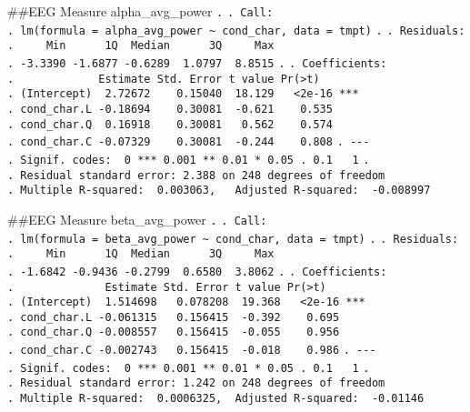 \documentclass[
]{article}
\begin{document}
\#\#EEG Measure alpha\_avg\_power \texttt{.} \texttt{.\ Call:}
\texttt{.\ lm(formula\ =\ alpha\_avg\_power\ \textasciitilde{}\ cond\_char,\ data\ =\ tmpt)}
\texttt{.} \texttt{.\ Residuals:}
\texttt{.\ \ \ \ \ Min\ \ \ \ \ \ 1Q\ \ Median\ \ \ \ \ \ 3Q\ \ \ \ \ Max}
\texttt{.\ -3.3390\ -1.6877\ -0.6289\ \ 1.0797\ \ 8.8515} \texttt{.}
\texttt{.\ Coefficients:}
\texttt{.\ \ \ \ \ \ \ \ \ \ \ \ \ Estimate\ Std.\ Error\ t\ value\ Pr(\textgreater{}\textbar{}t\textbar{})}
\texttt{.\ (Intercept)\ \ 2.72672\ \ \ \ 0.15040\ \ 18.129\ \ \ \textless{}2e-16\ ***}
\texttt{.\ cond\_char.L\ -0.18694\ \ \ \ 0.30081\ \ -0.621\ \ \ \ 0.535}
\texttt{.\ cond\_char.Q\ \ 0.16918\ \ \ \ 0.30081\ \ \ 0.562\ \ \ \ 0.574}
\texttt{.\ cond\_char.C\ -0.07329\ \ \ \ 0.30081\ \ -0.244\ \ \ \ 0.808}
\texttt{.\ -\/-\/-}
\texttt{.\ Signif.\ codes:\ \ 0\ \textquotesingle{}***\textquotesingle{}\ 0.001\ \textquotesingle{}**\textquotesingle{}\ 0.01\ \textquotesingle{}*\textquotesingle{}\ 0.05\ \textquotesingle{}.\textquotesingle{}\ 0.1\ \textquotesingle{}\ \textquotesingle{}\ 1}
\texttt{.}
\texttt{.\ Residual\ standard\ error:\ 2.388\ on\ 248\ degrees\ of\ freedom}
\texttt{.\ Multiple\ R-squared:\ \ 0.003063,\ \ \ Adjusted\ R-squared:\ \ -0.008997}

\#\#EEG Measure beta\_avg\_power \texttt{.} \texttt{.\ Call:}
\texttt{.\ lm(formula\ =\ beta\_avg\_power\ \textasciitilde{}\ cond\_char,\ data\ =\ tmpt)}
\texttt{.} \texttt{.\ Residuals:}
\texttt{.\ \ \ \ \ Min\ \ \ \ \ \ 1Q\ \ Median\ \ \ \ \ \ 3Q\ \ \ \ \ Max}
\texttt{.\ -1.6842\ -0.9436\ -0.2799\ \ 0.6580\ \ 3.8062} \texttt{.}
\texttt{.\ Coefficients:}
\texttt{.\ \ \ \ \ \ \ \ \ \ \ \ \ \ Estimate\ Std.\ Error\ t\ value\ Pr(\textgreater{}\textbar{}t\textbar{})}
\texttt{.\ (Intercept)\ \ 1.514698\ \ \ 0.078208\ \ 19.368\ \ \ \textless{}2e-16\ ***}
\texttt{.\ cond\_char.L\ -0.061315\ \ \ 0.156415\ \ -0.392\ \ \ \ 0.695}
\texttt{.\ cond\_char.Q\ -0.008557\ \ \ 0.156415\ \ -0.055\ \ \ \ 0.956}
\texttt{.\ cond\_char.C\ -0.002743\ \ \ 0.156415\ \ -0.018\ \ \ \ 0.986}
\texttt{.\ -\/-\/-}
\texttt{.\ Signif.\ codes:\ \ 0\ \textquotesingle{}***\textquotesingle{}\ 0.001\ \textquotesingle{}**\textquotesingle{}\ 0.01\ \textquotesingle{}*\textquotesingle{}\ 0.05\ \textquotesingle{}.\textquotesingle{}\ 0.1\ \textquotesingle{}\ \textquotesingle{}\ 1}
\texttt{.}
\texttt{.\ Residual\ standard\ error:\ 1.242\ on\ 248\ degrees\ of\ freedom}
\texttt{.\ Multiple\ R-squared:\ \ 0.0006325,\ \ Adjusted\ R-squared:\ \ -0.01146}
\end{document}
